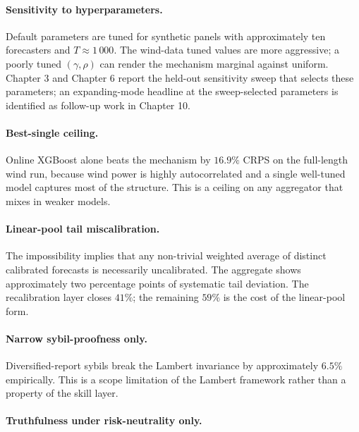 \documentclass[
  11pt,
  a4paper,
  oneside]{report}
\begin{document}
\paragraph{Sensitivity to hyperparameters.}

Default parameters are tuned for synthetic panels with approximately ten
forecasters and \(T \approx 1\,000\). The wind-data tuned values are
more aggressive; a poorly tuned \((\gamma, \rho)\) can render the
mechanism marginal against uniform. Chapter 3 and Chapter 6 report the
held-out sensitivity sweep that selects these parameters; an
expanding-mode headline at the sweep-selected parameters is identified
as follow-up work in Chapter 10.

\paragraph{Best-single ceiling.}

Online XGBoost alone beats the mechanism by \(16.9\%\) CRPS on the
full-length wind run, because wind power is highly autocorrelated and a
single well-tuned model captures most of the structure. This is a
ceiling on any aggregator that mixes in weaker models.

\paragraph{Linear-pool tail miscalibration.}

The \citet{ranjan2010combining} impossibility implies that any
non-trivial weighted average of distinct calibrated forecasts is
necessarily uncalibrated. The aggregate shows approximately two
percentage points of systematic tail deviation. The recalibration layer
closes \(41\%\); the remaining \(59\%\) is the cost of the linear-pool
form.

\paragraph{Narrow sybil-proofness only.}

Diversified-report sybils break the Lambert invariance by approximately
\(6.5\%\) empirically. This is a scope limitation of the Lambert
framework rather than a property of the skill layer.

\paragraph{Truthfulness under risk-neutrality only.}
\end{document}

